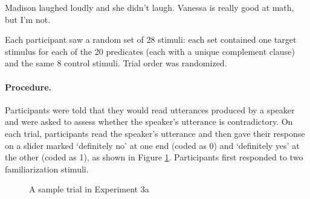 \documentclass[11pt,fleqn]{article}
\newcommand{\6}{\mbox{$[\hspace*{-.6mm}[$}}
\newcommand{\9}{\mbox{$]\hspace*{-.6mm}]$}}
\begin{document}
{\begin{exe}

\ex\label{control-bad} Madison laughed loudly and she didn't laugh.
\ex\label{control-good}  Vanessa is really good at math, but I'm not.
\end{exe}

Each participant saw a random set of 28 stimuli: each set contained one target stimulus for each of the 20 predicates (each with a unique complement clause) and the same 8 control stimuli. Trial order was randomized.


\paragraph{Procedure.} Participants were told that they would read utterances produced by a speaker and were asked to assess whether the speaker's utterance is contradictory. On each trial, participants read the speaker's utterance and then gave their response on a slider marked `definitely no' at one end (coded as 0) and `definitely yes' at the other (coded as 1), as shown in Figure \ref{f-trial-exp2}. Participants first responded to two familiarization stimuli.

\begin{figure}[h!]
\begin{center}
\end{center}
\caption{A sample trial in Experiment 3a}\label{f-trial-exp2}
\end{figure}

}
\end{document}
